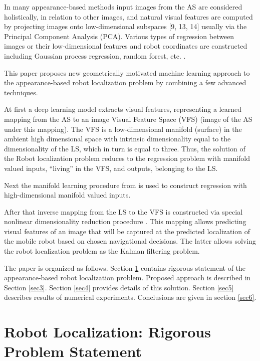\documentclass[conference]{IEEEtran} %
\begin{document}
In many appearance-based methods input images from the AS are considered holistically, in relation to other images, and natural visual features are computed by projecting images onto low-dimensional subspaces [9, 13, 14] usually via the Principal Component Analysis (PCA). Various types of regression between images or their low-dimensional features and robot coordinates are constructed including Gaussian process regression, random forest, etc. \cite{bib15,bib16,bib17,bib18,bib19,burn1,burn2,burn3}.

This paper proposes new geometrically motivated machine learning approach to the appearance-based robot localization problem by combining a few advanced techniques.

At first a deep learning model extracts visual features, representing a learned mapping from the AS to an image Visual Feature Space (VFS) (image of the AS under this mapping). The VFS is a low-dimensional manifold (surface) in the ambient high dimensional space with intrinsic dimensionality equal to the dimensionality of the LS, which in turn is equal to three. Thus, the solution of the Robot localization problem reduces to the regression problem with manifold valued inputs, ``living'' in the VFS, and outputs, belonging to the LS.

Next the manifold learning procedure from \cite{bib20} is used to construct regression with high-dimensional manifold valued inputs.

After that inverse mapping from the LS to the VFS is constructed via special nonlinear dimensionality reduction procedure \cite{bib21,bib22,bib23}. This mapping allows predicting visual features of an image that will be captured at the predicted localization of the mobile robot based on chosen navigational decisions. The latter allows solving the robot localization problem as the Kalman filtering problem.

The paper is organized as follows. Section \ref{sec2} contains rigorous statement of the appearance-based robot localization problem. Proposed approach is described in Section \ref{sec3}. Section \ref{sec4} provides details of this solution. Section \ref{sec5} describes results of numerical experiments. Conclusions are given in section \ref{sec6}.

\section{Robot Localization: Rigorous Problem Statement}
\label{sec2}
\end{document}
